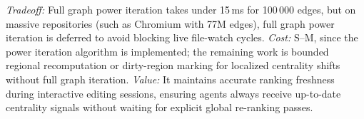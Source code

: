 \begin{description}
        \emph{Tradeoff:} Full graph power iteration takes under 15\,ms for 100\,000
        edges, but on massive repositories (such as Chromium with 77M edges), full
        graph power iteration is deferred to avoid blocking live file-watch cycles.
        \emph{Cost:} S--M, since the power iteration algorithm is implemented; the
        remaining work is bounded regional recomputation or dirty-region marking
        for localized centrality shifts without full graph iteration. \emph{Value:}
        It maintains accurate ranking freshness during interactive editing sessions,
        ensuring agents always receive up-to-date centrality signals without waiting
        for explicit global re-ranking passes.
\end{description}
